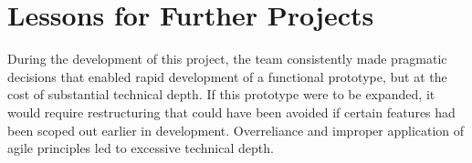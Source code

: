 \section{Lessons for Further Projects}
\label{sec:lessons-for-further-projects}

During the development of this project, the team consistently made pragmatic decisions that enabled rapid development of a functional prototype, but at the cost of substantial technical depth. If this prototype were to be expanded, it would require restructuring that could have been avoided if certain features had been scoped out earlier in development. Overreliance and improper application of agile principles led to excessive technical depth.
